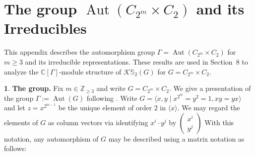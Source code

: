 \documentclass[12pt]{article}
\theoremstyle{plain}
\theoremstyle{definition}
\newtheorem{nothing}[theorem]{}
\newcommand{\kerlint}{\mathbb S_2}
\newcommand{\Aut}{\operatorname{Aut}}
\begin{document}
\appendix

\section{The group $\Aut(C_{2^m}\times C_2)$ and its Irreducibles}\label{app:evenp}


This appendix describes the automorphism group \(\Gamma = \operatorname{Aut}(C_{2^m} \times C_2)\) for $m\ge 3$ and its irreducible representations. These results are used in Section~8 to analyze the \(\mathbb C[\Gamma]\)-module structure of \(\mathcal{K}\kerlint(G)\) for \(G = C_{2^m} \times C_2\).


\begin{nothing} {\textbf{The group.}} 
Fix $m\in\mathbb Z_{\ge 3}$ and write $G = C_{2^m}\times C_2$. 
We give a presentation of the group $\Gamma:= \Aut(G)$ following \cite{BC}.
Write $G = \langle x, y\mid x^{2^m} = y^2 = 1, xy=yx\rangle$ and let $z = x^{2^{m-1}}$ be the unique element of order 2 in $\langle x\rangle$. We may regard the elements of $G$ as column vectors via identifying $x^i\cdot y^j$ by $\begin{pmatrix}
    x^i\\ y^j
\end{pmatrix}$ With this notation, any automorphism of $G$ may be described using a matrix notation as follows: 


\end{nothing}
\end{document}
